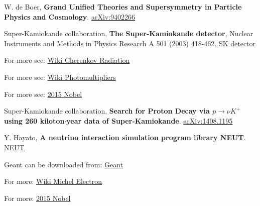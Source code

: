 \begin{thebibliography}{9}

  W. de Boer,
  \textbf{Grand Unified Theories
	and Supersymmetry in
	Particle Physics and Cosmology}.
  \href{https://arxiv.org/pdf/hep-ph/9402266.pdf}{arXiv:9402266}

  Super-Kamiokande collaboration,
  \textbf{The Super-Kamiokande detector},
  Nuclear Instruments and Methods in Physics Research A 501 (2003) 418-462. 
  \href{http://www-sk.icrr.u-tokyo.ac.jp/~masato_s/class/sk-detector.pdf}{SK detector}
  
  For more see: 
  \href{https://en.wikipedia.org/wiki/Cherenkov_radiation}{Wiki Cherenkov Radiation}

  For more see: 
  \href{https://en.wikipedia.org/wiki/Photomultiplier}{Wiki Photomultipliers}
  
  For more see: 
  \href{http://www.nobelprize.org/nobel_prizes/physics/laureates/2015/}{2015 Nobel}
  
  Super-Kamiokande collaboration,
  \textbf{Search for Proton Decay via $p\rightarrow \nu K^{+}$ using 260 kiloton$\cdot$year data of Super-Kamiokande}.
  \href{https://arxiv.org/pdf/1408.1195v1.pdf}{arXiv:1408.1195}
  
  Y. Hayato,
   \textbf{A neutrino interaction simulation program library NEUT}.
  \href{http://inspirehep.net/record/844435/files/v40p2477.pdf?version=1}{NEUT}
  
  Geant can be downloaded from: 
  \href{https://root.cern.ch/installing-geant3}{Geant}
  
  For more:
  \href{https://en.wikipedia.org/wiki/Michel_parameters}{Wiki Michel Electron}
  
  For more:
  \href{http://www.nobelprize.org/nobel_prizes/physics/laureates/2015/}{2015 Nobel}


\end{thebibliography}

